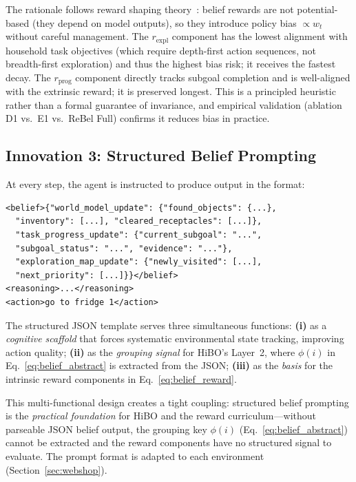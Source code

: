 \documentclass{article}
\begin{document}
The rationale follows reward shaping theory~\citep{ng1999policy}: belief
rewards are not potential-based (they depend on model outputs), so they
introduce policy bias $\propto w_t$ without careful management.
The $r_{\text{expl}}$ component has the lowest alignment with household task
objectives (which require depth-first action sequences, not breadth-first
exploration) and thus the highest bias risk; it receives the fastest decay.
The $r_{\text{prog}}$ component directly tracks subgoal completion and is
well-aligned with the extrinsic reward; it is preserved longest.
This is a principled heuristic rather than a formal guarantee of invariance,
and empirical validation (ablation D1 vs.\ E1 vs.\ ReBel Full) confirms it
reduces bias in practice.


\subsection{Innovation 3: Structured Belief Prompting}
\label{sec:belief_prompt}

At every step, the agent is instructed to produce output in the format:
\begin{small}
\begin{verbatim}
<belief>{"world_model_update": {"found_objects": {...},
  "inventory": [...], "cleared_receptacles": [...]},
  "task_progress_update": {"current_subgoal": "...",
  "subgoal_status": "...", "evidence": "..."},
  "exploration_map_update": {"newly_visited": [...],
  "next_priority": [...]}}</belief>
<reasoning>...</reasoning>
<action>go to fridge 1</action>
\end{verbatim}
\end{small}
The structured JSON template serves three simultaneous functions:
\textbf{(i)} as a \emph{cognitive scaffold} that forces systematic environmental
state tracking, improving action quality;
\textbf{(ii)} as the \emph{grouping signal} for HiBO's Layer~2, where
$\phi(i)$ in Eq.~\eqref{eq:belief_abstract} is extracted from the JSON;
\textbf{(iii)} as the \emph{basis} for the intrinsic reward components
in Eq.~\eqref{eq:belief_reward}.

This multi-functional design creates a tight coupling: structured belief
prompting is the \emph{practical foundation} for HiBO and the reward
curriculum---without parseable JSON belief output, the grouping key
$\phi(i)$ (Eq.~\ref{eq:belief_abstract}) cannot be extracted and the
reward components have no structured signal to evaluate.
The prompt format is adapted to each environment (Section~\ref{sec:webshop}).
\end{document}
